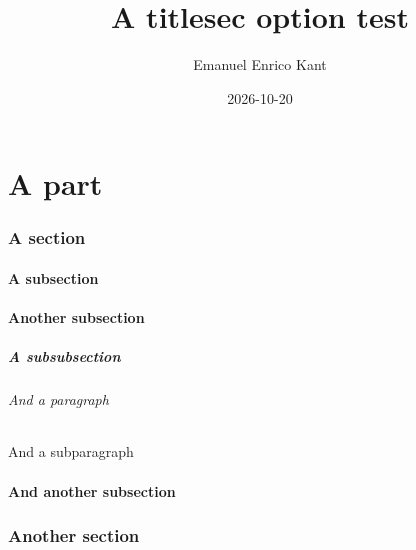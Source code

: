 \documentclass{article}
\begin{document}
\title{A titlesec option test}
\author{Emanuel Enrico Kant}
\date{2026-10-20}

\maketitle

\part{A part}

\kant[1][1-2]

\section[Testing the \texttt{toctitles} option (or not)]{A section}

\kant[2][1-2]

\subsection{A subsection}

\kant[3][1-2]

\subsection{Another subsection}

\kant[3][3-4]

\subsubsection{A subsubsection}

\kant[4][1-2]

\paragraph{And a paragraph}

\kant[5][1-2]

\subparagraph{And a subparagraph}

\kant[6]

\subsection{And another subsection}

\kant[7]


\section{Another section}

\kant[8]


\tableofcontents
\end{document}
